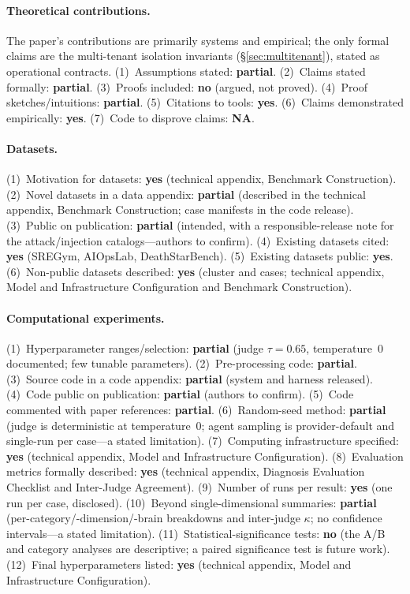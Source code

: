 \documentclass[letterpaper]{article}
\begin{document}
\paragraph{Theoretical contributions.}
The paper's contributions are primarily systems and empirical; the only formal claims are the multi-tenant isolation invariants (\S\ref{sec:multitenant}), stated as operational contracts.
(1)~Assumptions stated: \textbf{partial}. (2)~Claims stated formally: \textbf{partial}. (3)~Proofs included: \textbf{no} (argued, not proved). (4)~Proof sketches/intuitions: \textbf{partial}. (5)~Citations to tools: \textbf{yes}. (6)~Claims demonstrated empirically: \textbf{yes}. (7)~Code to disprove claims: \textbf{NA}.

\paragraph{Datasets.}
(1)~Motivation for datasets: \textbf{yes} (technical appendix, Benchmark Construction). (2)~Novel datasets in a data appendix: \textbf{partial} (described in the technical appendix, Benchmark Construction; case manifests in the code release). (3)~Public on publication: \textbf{partial} (intended, with a responsible-release note for the attack/injection catalogs---authors to confirm). (4)~Existing datasets cited: \textbf{yes} (SREGym, AIOpsLab, DeathStarBench). (5)~Existing datasets public: \textbf{yes}. (6)~Non-public datasets described: \textbf{yes} (cluster and cases; technical appendix, Model and Infrastructure Configuration and Benchmark Construction).

\paragraph{Computational experiments.}
(1)~Hyperparameter ranges/selection: \textbf{partial} (judge $\tau=0.65$, temperature~0 documented; few tunable parameters). (2)~Pre-processing code: \textbf{partial}. (3)~Source code in a code appendix: \textbf{partial} (system and harness released). (4)~Code public on publication: \textbf{partial} (authors to confirm). (5)~Code commented with paper references: \textbf{partial}. (6)~Random-seed method: \textbf{partial} (judge is deterministic at temperature~0; agent sampling is provider-default and single-run per case---a stated limitation). (7)~Computing infrastructure specified: \textbf{yes} (technical appendix, Model and Infrastructure Configuration). (8)~Evaluation metrics formally described: \textbf{yes} (technical appendix, Diagnosis Evaluation Checklist and Inter-Judge Agreement). (9)~Number of runs per result: \textbf{yes} (one run per case, disclosed). (10)~Beyond single-dimensional summaries: \textbf{partial} (per-category/-dimension/-brain breakdowns and inter-judge $\kappa$; no confidence intervals---a stated limitation). (11)~Statistical-significance tests: \textbf{no} (the A/B and category analyses are descriptive; a paired significance test is future work). (12)~Final hyperparameters listed: \textbf{yes} (technical appendix, Model and Infrastructure Configuration).
\end{document}
